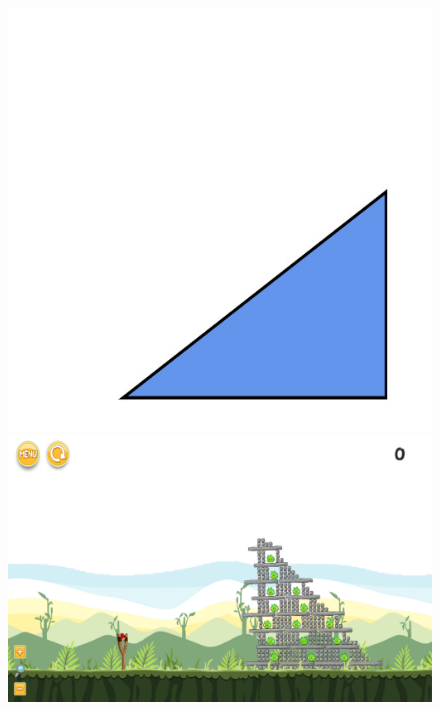 \documentclass{dalthesis}
\begin{document}
\begin{figure}
  \includegraphics[width=\textwidth,height=\textheight,keepaspectratio]{levels/pictures/mechanisms/inclined_plane.jpg}
  \includegraphics[width=\textwidth,height=\textheight,keepaspectratio]{levels/screenshots/mechanisms/inclined_plane.png}
\end{figure}
\end{document}
